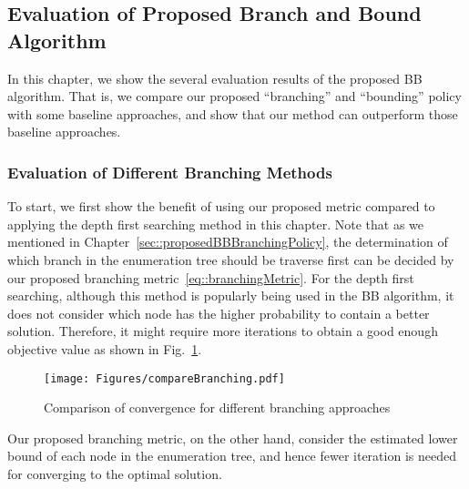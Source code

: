 \subsection{Evaluation of Proposed Branch and Bound Algorithm}
In this chapter, we show the several evaluation results of the proposed BB algorithm.
That is, we compare our proposed ``branching'' and ``bounding'' policy with some baseline approaches, and show that our method can outperform those baseline approaches.

\subsubsection{Evaluation of Different Branching Methods}
To start, we first show the benefit of using our proposed metric compared to applying the depth first searching method in this chapter.
Note that as we mentioned in Chapter~\ref{sec::proposedBBBranchingPolicy}, the determination of which branch in the enumeration tree should be traverse first can be decided by our proposed branching metric~\eqref{eq::branchingMetric}.
For the depth first searching, although this method is popularly being used in the BB algorithm, it does not consider which node has the higher probability to contain a better solution.
Therefore, it might require more iterations to obtain a good enough objective value as shown in Fig.~\ref{fig::compareBranching}.
%
\begin{figure}
\begin{center}
\texttt{[image: Figures/compareBranching.pdf]}
\caption{\label{fig::compareBranching} Comparison of convergence for different branching approaches}
\end{center}
\end{figure}
%
Our proposed branching metric, on the other hand, consider the estimated lower bound of each node in the enumeration tree, and hence fewer iteration is needed for converging to the optimal solution.


